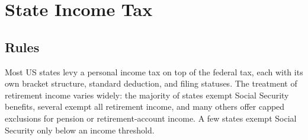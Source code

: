 \documentclass[fleqn,12pt]{report}
\begin{document}
\section{State Income Tax}

\subsection*{Rules}
Most US states levy a personal income tax on top of the federal tax, each with
its own bracket structure, standard deduction, and filing statuses.
The treatment of retirement income varies widely: the majority of states exempt
Social Security benefits, several exempt all retirement income, and many others
offer capped exclusions for pension or retirement-account income.
A few states exempt Social Security only below an income threshold.
\end{document}
